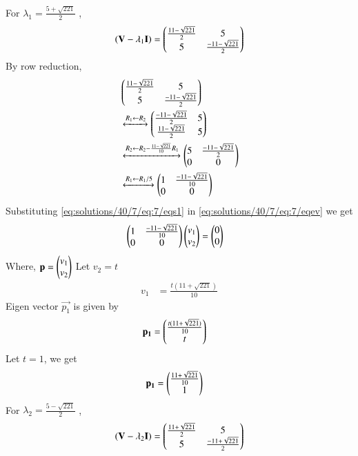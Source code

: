\begin{enumerate}
For $\lambda_1=\frac{5+\sqrt{221}}{2}$ ,
\begin{align}
    (\mathbf{V}-\lambda_1\mathbf{I})=\begin{pmatrix}\frac{11-\sqrt{221}}{2} & 5 \\5 & \frac{-11-\sqrt{221}}{2}\end{pmatrix}
\end{align}
By row reduction, 
\begin{align}
    &\begin{pmatrix}\frac{11-\sqrt{221}}{2} & 5 \\5 & \frac{-11-\sqrt{221}}{2}\end{pmatrix}\\
    &\xleftrightarrow{R_1\leftarrow R_2}
    \begin{pmatrix}\frac{-11-\sqrt{221}}{2} & 5 \\ \frac{11-\sqrt{221}}{2} & 5\end{pmatrix}\\
 &\xleftrightarrow{R_2\leftarrow R_2-\frac{11-\sqrt{221}}{10}R_{1}}
    \begin{pmatrix}5 & \frac{-11-\sqrt{221}}{2} \\ 0& 0\end{pmatrix}\\
     &\xleftrightarrow{R_1\leftarrow R_1/5}
    \begin{pmatrix}1 & \frac{-11-\sqrt{221}}{10} \\ 0& 0\end{pmatrix}
    \label{eq:solutions/40/7/eq:7/eqs1}
\end{align}
Substituting \eqref{eq:solutions/40/7/eq:7/eqs1} in \eqref{eq:solutions/40/7/eq:7/eqev} we get
\begin{align}
        & \begin{pmatrix}1 & \frac{-11-\sqrt{221}}{10} \\ 0& 0\end{pmatrix}\begin{pmatrix}v_1 \\ v_2\end{pmatrix}=\begin{pmatrix}0 \\ 0\end{pmatrix}\label{eq:solutions/40/7/eq:7/eqei1}
\end{align}
Where, $\mathbf{p}=\begin{pmatrix}v_1\\v_2\end{pmatrix}$
Let $v_2=t$
\begin{align}
    v_1&=\frac{t(11+\sqrt{221})}{10}
\end{align}
Eigen vector $\vec{p_1}$ is given by
\begin{align}
    \mathbf{p_1}&=\begin{pmatrix}\frac{t(11+\sqrt{221})}{10} \\ t\end{pmatrix}
\end{align}
Let $t=1$, we get
\begin{align}
        \mathbf{p_1}&=\begin{pmatrix}\frac{11+\sqrt{221}}{10} \\1 \end{pmatrix}\label{eq:solutions/40/7/eq:es71/eqp1}
\end{align}
For $\lambda_2=\frac{5-\sqrt{221}}{2}$ ,
\begin{align}
    (\vec{V}-\lambda_2\vec{I})=\myvec{\frac{11+\sqrt{221}}{2} & 5 \\5 & \frac{-11+\sqrt{221}}{2}}

\end{align}
\end{enumerate}
